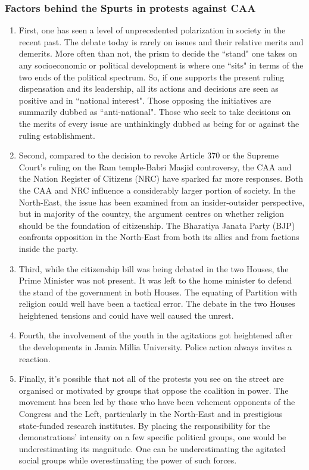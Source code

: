 \documentclass{article}
\begin{document}
\subsubsection{Factors behind the Spurts in protests against CAA}
\begin{enumerate}
    \item First, one has seen a level of unprecedented polarization in society in the recent past. The debate today is rarely on issues and their relative merits and demerits. More often than not, the prism to decide the “stand" one takes on any socioeconomic or political development is where one “sits" in terms of the two ends of the political spectrum. So, if one supports the present ruling dispensation and its leadership, all its actions and decisions are seen as positive and in “national interest". Those opposing the initiatives are summarily dubbed as “anti-national". Those who seek to take decisions on the merits of every issue are unthinkingly dubbed as being
for or against the ruling establishment.  
    \item Second, compared to the decision to revoke Article 370 or the Supreme Court's ruling on the Ram temple-Babri Masjid controversy, the CAA and the Nation Register of Citizens (NRC) have sparked far more responses. Both the CAA and NRC influence a considerably larger portion of society. In the North-East, the issue has been examined from an insider-outsider perspective, but in majority of the country, the argument centres on whether religion should be the foundation of citizenship. The Bharatiya Janata Party (BJP) confronts
opposition in the North-East from both its allies and from factions inside the party.
    \item Third, while the citizenship bill was being debated in the two Houses, the Prime Minister was not present. It was left to the home minister to defend the stand of the government in both Houses. The equating of Partition with religion could well have been a tactical
error. The debate in the two Houses heightened tensions and could have well caused the unrest.
    \item Fourth, the involvement of the youth in the agitations got heightened after the developments in Jamia Millia University. Police action always invites a reaction.
    \item Finally, it's possible that not all of the protests you see on the street are organised or motivated by groups that oppose the coalition in power. The movement has been led by those who have been vehement opponents of the Congress and the Left, particularly in the North-East and in prestigious state-funded research institutes. By placing the responsibility for the demonstrations' intensity on a few specific political groups, one would be underestimating its magnitude. One can be underestimating the agitated social groups while
overestimating the power of such forces.
\end{enumerate}
\end{document}
